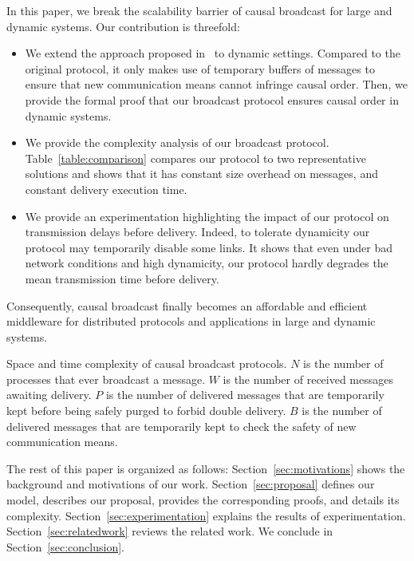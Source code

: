 In this paper, we break the scalability barrier of causal broadcast for large
and dynamic systems.  Our contribution is threefold:
\begin{itemize}[leftmargin=*]
\item We extend the approach proposed in~\cite{friedman2004causal} to dynamic
  settings. Compared to the original protocol, it only makes use of temporary
  buffers of messages to ensure that new communication means cannot infringe
  causal order.  Then, we provide the formal proof that our broadcast protocol
  ensures causal order in dynamic systems.
\item We provide the complexity analysis of our broadcast
  protocol. Table~\ref{table:comparison} compares our protocol to two
  representative solutions and shows that it has constant size overhead on
  messages, and constant delivery execution time.
\item We provide an experimentation highlighting the impact of our protocol on
  transmission delays before delivery. Indeed, to tolerate dynamicity our
  protocol may temporarily disable some links.  It shows that even under bad
  network conditions and high dynamicity, our protocol hardly degrades
  the mean transmission time before delivery.
\end{itemize}
Consequently, causal broadcast finally becomes an affordable and efficient
middleware for distributed protocols and applications in large and dynamic
systems.

\begin{table}
  \caption{\label{table:comparison} Space and time complexity of causal
    broadcast protocols. 
    $N$ is the number of processes that ever broadcast a message.
    $W$ is the number of received messages awaiting delivery.
    $P$ is the number of delivered messages that are temporarily kept before 
    being safely purged to forbid double delivery.
    $B$ is the number of delivered messages that are temporarily kept to check the safety of new communication means.}
  
\end{table}

The rest of this paper is organized as follows: Section~\ref{sec:motivations}
shows the background and motivations of our work. Section~\ref{sec:proposal}
defines our model, describes our proposal, provides the corresponding proofs,
and details its complexity. Section~\ref{sec:experimentation} explains the
results of experimentation.  Section~\ref{sec:relatedwork} reviews the related
work. We conclude in Section~\ref{sec:conclusion}.

